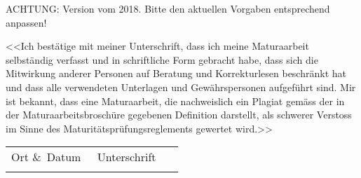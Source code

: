 {\Huge ACHTUNG: Version vom 2018. Bitte den aktuellen Vorgaben
entsprechend anpassen!}

<<Ich bestätige mit meiner Unterschrift, dass ich meine Maturaarbeit selbständig verfasst und in schriftliche Form gebracht habe, dass sich die Mitwirkung anderer Personen auf Beratung und Korrekturlesen beschränkt hat und dass alle verwendeten Unterlagen und Gewährspersonen aufgeführt sind. Mir ist bekannt, dass eine Maturaarbeit, die nachweislich ein Plagiat gemäss der in der Maturaarbeitsbroschüre gegebenen Definition darstellt, als schwerer Verstoss im Sinne des Maturitätsprüfungsreglements gewertet wird.>>

\vspace{3cm}

\noindent
\begin{tabular}{p{0.47\linewidth}p{0.47\linewidth}}
  Ort \&\ Datum & Unterschrift \\
  & \\[1cm]
  \hline
\end{tabular}
